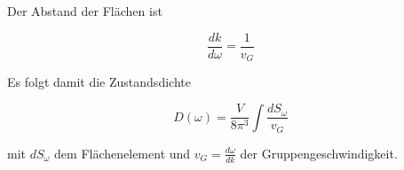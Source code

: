 Der Abstand der Flächen ist

\begin{equation}
    \frac{d k}{d \omega} = \frac{1}{v_G}
\end{equation}

Es folgt damit die Zustandsdichte

\begin{equation}
    D(\omega) = \frac{V}{8 \pi^3} \int \frac{d S_{\omega}}{v_G}
\end{equation}

mit $d S_{\omega}$ dem Flächenelement und $v_G = \frac{d \omega}{d k}$ der Gruppengeschwindigkeit.